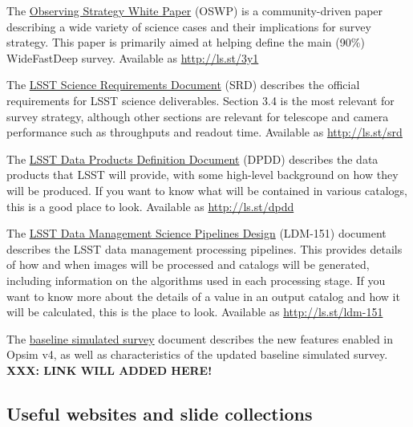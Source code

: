 \documentclass[DM,lsstdraft,toc,usenatbib]{lsstdoc}
\begin{document}
The \href{https://github.com/LSSTScienceCollaborations/ObservingStrategy}{Observing Strategy White Paper}  (OSWP) is a community-driven paper describing a wide variety of science cases and their implications for survey strategy. This paper is primarily aimed at helping define the main (90\%) WideFastDeep survey. Available as \url{http://ls.st/3y1}

The \href{http:/ls.st/srd}{LSST Science Requirements Document} (SRD) describes the official requirements for LSST science deliverables. Section 3.4 is the most relevant for survey strategy, although other sections are relevant for telescope and camera performance such as throughputs and readout time. Available as \url{http://ls.st/srd}

The \href{http://ls.st/dpdd}{LSST Data Products Definition Document} (DPDD) describes the data products that LSST will provide, with some high-level background on how they will be produced. If you want to know what will be contained in various catalogs, this is a good place to look. Available as \url{http://ls.st/dpdd}

The \href{http://ls.st/ldm-151}{LSST Data Management Science Pipelines Design} (LDM-151) document describes the LSST data management processing pipelines. This provides details of how and when images will be processed and catalogs will be generated, including information on the algorithms used in each processing stage. If you want to know more about the details of a value in an output catalog and how it will be calculated, this is the place to look. Available as \url{http://ls.st/ldm-151}


The \href{https://github.com/lsst-pst/survey_strategy/blob/master/db/baseline-doc/baseline.pdf}{baseline simulated survey} document describes the new features enabled in Opsim v4, as well as characteristics of the updated baseline simulated survey. 
{\bf XXX: LINK WILL ADDED HERE!}


\subsection{Useful websites and slide collections}
\end{document}
